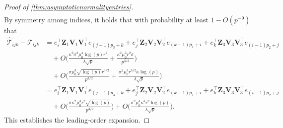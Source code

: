 \documentclass[10pt]{article}
\newcommand{\0}{{\mathbf{0}}}
\newcommand{\1}{{\mathbf{1}}}
\renewcommand{\t}{^{\top}}
\renewcommand{\hat}{\widehat}
\renewcommand{\hat}{\widehat}
\begin{document}
\begin{proof}[Proof of \cref{thm:asymptoticnormalityentries}]
\begin{align*}
\end{align*}
By symmetry among indices, it holds that with probability at least $1 - O(p^{-9})$ that
\begin{align}
    \mathcal{\hat T}_{ijk} - \mathcal{T}_{ijk} &= e_i\t \mathbf{Z}_1 \mathbf{V}_1 \mathbf{V}_1\t e_{(j-1)p_3 + k} + e_j\t \mathbf{Z}_2 \mathbf{V}_2 \mathbf{V}_2\t e_{(k-1)p_1 + i} + e_k\t \mathbf{Z}_3 \mathbf{V}_3 \mathbf{V}_3\t e_{(i-1)p_2 + j} \nonumber\\
    &\quad + O\bigg( \frac{\kappa^2 \sigma^2 \mu_0^4 \log(p) r^2}{\lambda \sqrt{p}} + \frac{\kappa^2 \mu_0^3 r^2 \sigma}{p^{3/2}} \bigg) \nonumber \\
    &\quad + O\bigg( \frac{\sigma \mu_0^3 \sqrt{\log(p)} r^{3/2}}{p^{3/2}} + \frac{\sigma^2 \mu_0^3 r^{3/2} \kappa \log(p)}{\lambda \sqrt{p}} \bigg) \nonumber \\
    &= e_i\t \mathbf{Z}_1 \mathbf{V}_1 \mathbf{V}_1\t e_{(j-1)p_3 + k} + e_j\t \mathbf{Z}_2 \mathbf{V}_2 \mathbf{V}_2\t e_{(k-1)p_1 + i} + e_k\t \mathbf{Z}_3 \mathbf{V}_3 \mathbf{V}_3\t e_{(i-1)p_2 + j} \nonumber\\
    &\quad + O\bigg(\frac{\sigma \kappa^2 \mu_0^3 r^2 \sqrt{ \log(p)}}{p^{3/2}} \bigg)+  O\bigg( \frac{\sigma^2 \mu_0^4 \kappa^3 r^{2} \log(p)}{\lambda \sqrt{p}}\bigg). \label{mainentrywiseexpansion}
\end{align}
This establishes the leading-order expansion.  


\end{proof}
\end{document}
